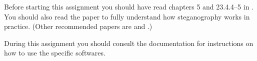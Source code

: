 Before starting this assignment you should have read chapters 5 and 23.4.4--5 
in  \cite{Anderson2008sea}.
You should also read the paper  
\cite{johnson1998exploring} to fully understand how steganography works in 
practice.
(Other recommended papers are  
\cite{anderson1998limits} and  
\cite{provos2003hide}.)

During this assignment you should consult the documentation  
\cite{gpgdoc,gpg4windoc,outguess,openpuffdoc} for instructions on
how to use the specific softwares.
